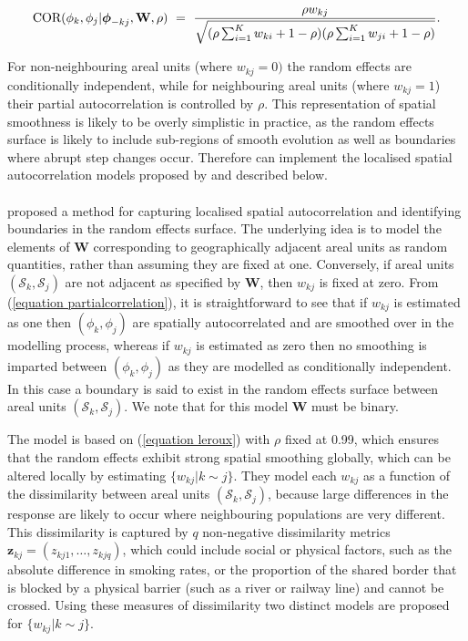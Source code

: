 \documentclass[article,shortnames,nojss]{jss}
\newcommand{\bd}[1]{\ensuremath{\mbox{\boldmath $#1$}}}
\begin{document}
\begin{equation}
\mbox{COR}(\phi_{k},\phi_{j}|\bd{\phi}_{-kj}, \mathbf{W}, \rho)~=~\frac{\rho w_{kj}}{\sqrt{(\rho\sum_{i=1}^{K}w_{ki} + 1-\rho)(\rho\sum_{i=1}^{K}w_{ji} + 1-\rho)}}\label{equation partialcorrelation}.
\end{equation}


For non-neighbouring areal units (where $w_{kj}=0)$ the random effects are conditionally independent, while for neighbouring areal units (where $w_{kj}=1$) their partial autocorrelation is controlled by $\rho$. This representation of spatial smoothness is likely to be overly simplistic in practice, as the random effects surface is likely to include sub-regions of smooth evolution as well as boundaries where abrupt step changes occur. Therefore  can implement the localised spatial autocorrelation models proposed by \cite{lee2012} and \cite{lee2015} described below.\\


\\ 
\cite{lee2012} proposed a method for capturing localised spatial autocorrelation and identifying boundaries in the random effects surface. The underlying idea is to model the elements of $\mathbf{W}$ corresponding to geographically adjacent areal units as random quantities, rather than assuming they are fixed at one. Conversely, if areal units $(\mathcal{S}_{k},\mathcal{S}_{j})$ are not adjacent as specified by $\mathbf{W}$, then $w_{kj}$ is fixed at zero. From (\ref{equation partialcorrelation}), it is straightforward to see that if $w_{kj}$ is estimated as one then $(\phi_k, \phi_j)$ are spatially autocorrelated and are smoothed over in the modelling process, whereas if $w_{kj}$ is estimated as zero then no smoothing is imparted between $(\phi_k, \phi_j)$ as they are modelled as conditionally independent. In this case a boundary is said to exist in the random effects surface between areal units $(\mathcal{S}_{k},\mathcal{S}_{j})$. We note that for this model $\mathbf{W}$ must be binary.

\hspace{1cm} The model is based on (\ref{equation leroux}) with $\rho$ fixed at 0.99, which ensures that the random effects exhibit strong spatial smoothing globally, which can be altered locally by estimating $\{w_{kj}|k\sim j\}$. They model each $w_{kj}$ as a function of the dissimilarity between areal units $(\mathcal{S}_{k},\mathcal{S}_{j})$, because large differences in the response are likely to occur where neighbouring populations are very different. This dissimilarity is captured by $q$ non-negative dissimilarity metrics $\mathbf{z}_{kj}=(z_{kj1},\ldots,z_{kjq})$, which could include social or physical factors, such as the absolute difference in smoking rates, or the proportion of the shared border that is blocked by a physical barrier (such as a river or railway line) and cannot be crossed. Using these measures of dissimilarity two distinct models are proposed for $\{w_{kj}|k\sim j\}$.
\end{document}
